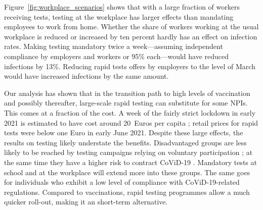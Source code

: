 Figure~\ref{fig:workplace_scenarios} shows that with a large fraction of workers
receiving tests, testing at the workplace has larger effects than mandating employees to
work from home. Whether the share of workers working at the usual workplace is reduced
or increased by ten percent hardly has an effect on infection rates. Making testing
mandatory twice a week---assuming independent compliance by employers and workers or
95\% each---would have reduced infections by 13\%. Reducing rapid tests offers by
employers to the level of March would have increased infections by the same amount.

Our analysis has shown that in the transition path to high levels of vaccination and
possibly thereafter, large-scale rapid testing can substitute for some NPIs. This comes
at a fraction of the cost. A week of the fairly strict lockdown in early 2021 is
estimated to have cost around 20~Euros per capita \citet{Wollmershauser2021}; retail
prices for rapid tests were below one Euro in early June 2021. Despite these large
effects, the results on testing likely understate the benefits. Disadvantaged groups are
less likely to be reached by testing campaigns relying on voluntary participation
\citep[e.g.][]{StillmanTonin2021}; at the same time they have a higher risk to contract
CoViD-19 \citep{KochInstitut2021a}. Mandatory tests at school and at the workplace will
extend more into these groups. The same goes for individuals who exhibit a low level of
compliance with CoViD-19-related regulations. Compared to vaccinations, rapid testing
programmes allow a much quicker roll-out, making it an  short-term alternative.